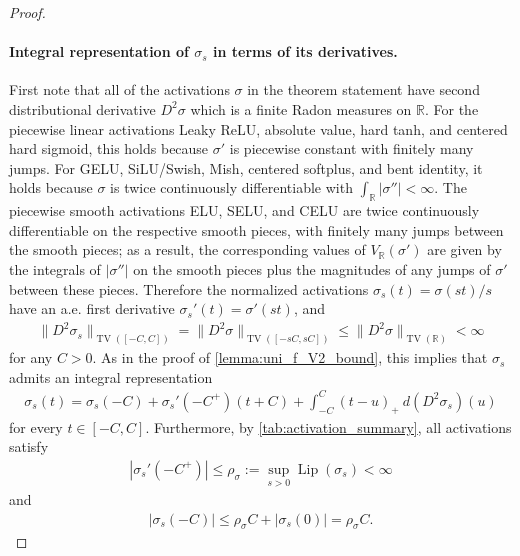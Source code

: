\documentclass{article}
\DeclareMathOperator{\TV}{TV}
\DeclareMathOperator{\Lip}{\mathrm{Lip}}
\def\bR{{\mathbb{R}}}
\newcommand{\R}{\mathbb{R}}
\begin{document}
\begin{appendices}
\begin{proof}
    \paragraph{Integral representation of $\sigma_s$ in terms of its derivatives.} First note that all of the activations $\sigma$ in the theorem statement have second distributional derivative $D^2 \sigma$ which is a finite Radon measures on $\R$. For the piecewise linear activations Leaky ReLU, absolute value, hard tanh, and centered hard sigmoid, this holds because $\sigma'$ is piecewise constant with finitely many jumps. For GELU, SiLU/Swish, Mish, centered softplus, and bent identity, it holds because $\sigma$ is twice continuously differentiable with $\int_\R |\sigma''| < \infty$. The piecewise smooth activations ELU, SELU, and CELU are twice continuously differentiable on the respective smooth pieces, with finitely many jumps between the smooth pieces; as a result, the corresponding values of $V_\R(\sigma')$ are given by the integrals of $|\sigma''|$ on the smooth pieces plus the magnitudes of any jumps of $\sigma'$ between these pieces. Therefore the normalized activations $\sigma_s(t) = \sigma(st)/s$ have an a.e. first derivative $\sigma_s'(t) = \sigma'(st)$, and
    \begin{align} \label{eq:sigma_s_var_bound}
        \| D^2 \sigma_s  \|_{\TV([-C,C])} = \| D^2 \sigma\|_{\TV([-sC, sC])} \leq \| D^2 \sigma \|_{\TV(\bR)} < \infty 
    \end{align}
    for any $C > 0$. As in the proof of \cref{lemma:uni_f_V2_bound}, this implies that $\sigma_s$ admits an integral representation
    \begin{align} \label{eq:sigma_s_int_rep}
        \sigma_s(t) = \sigma_s(-C) + \sigma_s'(-C^+) (t+C) + \int_{-C}^C (t-u)_+ \ d (D^2 \sigma_s)(u)
    \end{align}
    for every $t \in [-C,C]$. Furthermore, by \cref{tab:activation_summary}, all activations satisfy
    \begin{align} \label{eq:sigma_s_deriv_bound}
        |\sigma_s'(-C^+)| \leq \rho_\sigma := \sup_{s > 0} \Lip(\sigma_s) < \infty
    \end{align}
    and
    \begin{align} \label{eq:sigma_s_endpoint_bound}
        |\sigma_s(-C)| \leq \rho_\sigma C + |\sigma_s(0)| = \rho_\sigma C.
    \end{align}

    

\end{proof}
\end{appendices}
\end{document}

